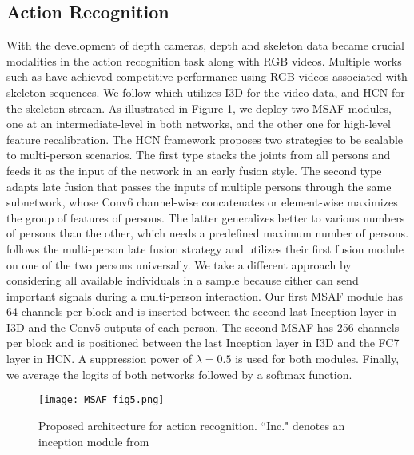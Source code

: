 \documentclass[10pt,twocolumn,letterpaper]{article}
\begin{document}
\subsection{Action Recognition}
With the development of depth cameras, depth and skeleton data became crucial modalities in the action recognition task along with RGB videos. Multiple works such as \cite{joze2020mmtm, li2020sgm, liu2018recognizing} have achieved competitive performance using RGB videos associated with skeleton sequences. We follow \cite{joze2020mmtm} which utilizes I3D \cite{carreira2017quo} for the video data, and HCN \cite{ijcai2018-0109} for the skeleton stream. As illustrated in Figure \ref{fig5}, we deploy two MSAF modules, one at an intermediate-level in both networks, and the other one for high-level feature recalibration. The HCN framework proposes two strategies to be scalable to multi-person scenarios. The first type stacks the joints from all persons and feeds it as the input of the network in an early fusion style. The second type adapts late fusion that passes the inputs of multiple persons through the same subnetwork, whose Conv6 channel-wise concatenates or element-wise maximizes the group of features of persons. The latter generalizes better to various numbers of persons than the other, which needs a predefined maximum number of persons. \cite{joze2020mmtm} follows the multi-person late fusion strategy and utilizes their first fusion module on one of the two persons universally. We take a different approach by considering all available individuals in a sample because either can send important signals during a multi-person interaction. Our first MSAF module has 64 channels per block and is inserted between the second last Inception layer in I3D and the Conv5 outputs of each person. The second MSAF has 256 channels per block and is positioned between the last Inception layer in I3D and the FC7 layer in HCN. A suppression power of $\lambda=0.5$ is used for both modules. Finally, we average the logits of both networks followed by a softmax function. 

\begin{figure}[t]
\centering
\texttt{[image: MSAF\_fig5.png]} \caption{Proposed architecture for action recognition. ``Inc." denotes an inception module from \cite{carreira2017quo}}
\label{fig5}
\end{figure}
\end{document}
